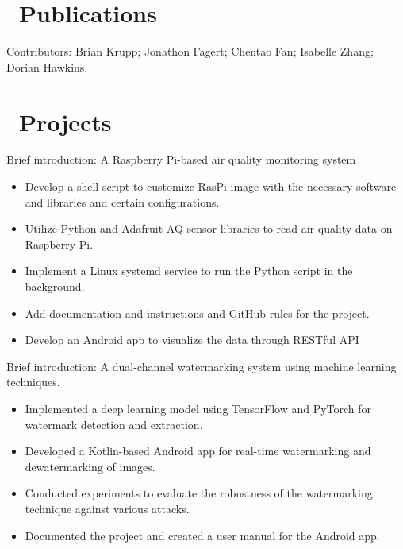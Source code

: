 \documentclass[12pt]{resume}
\begin{document}

\section{\texorpdfstring{\textbf{\faBuildingColumns}\ Publications}{Publications}}

Contributors: Brian Krupp; Jonathon Fagert; Chentao Fan; Isabelle Zhang; Dorian Hawkins.


\section{\texorpdfstring{\textbf{\faListCheck}\ Projects}{Projects}}

Brief introduction: A Raspberry Pi-based air quality monitoring system
\begin{itemize}
  \item Develop a shell script to customize RasPi image with the necessary software and libraries and certain configurations.
  \item Utilize Python and Adafruit AQ sensor libraries to read air quality data on Raspberry Pi.
  \item Implement a Linux systemd service to run the Python script in the background.
  \item Add documentation and instructions and GitHub rules for the project.
  \item Develop an Android app to visualize the data through RESTful API
\end{itemize}

Brief introduction: A dual-channel watermarking system using machine learning techniques.
\begin{itemize}
  \item Implemented a deep learning model using TensorFlow and PyTorch for watermark detection and extraction.
  \item Developed a Kotlin-based Android app for real-time watermarking and dewatermarking of images.
  \item Conducted experiments to evaluate the robustness of the watermarking technique against various attacks.
  \item Documented the project and created a user manual for the Android app.
\end{itemize}
\end{document}
